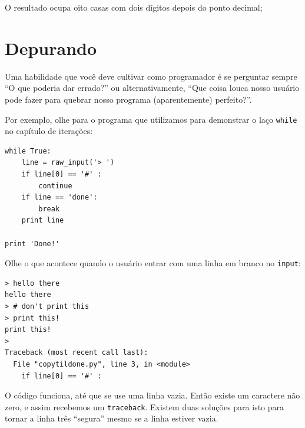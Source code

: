 {O resultado ocupa oito casas com dois dígitos
depois do ponto decimal;

\section{Depurando}


Uma habilidade que você deve cultivar como programador é se perguntar sempre
``O que poderia dar errado?'' ou alternativamente, ``Que coisa louca nosso
usuário pode fazer para quebrar nosso programa (aparentemente) perfeito?''.


Por exemplo, olhe para o programa que utilizamos para demonstrar o laço
{\tt while} no capítulo de iterações:

\beforeverb
\begin{verbatim}
while True:
    line = raw_input('> ')
    if line[0] == '#' :
        continue
    if line == 'done':
        break
    print line

print 'Done!'
\end{verbatim}
\afterverb
%
%
Olhe o que acontece quando o usuário entrar com uma linha em branco no
{\tt input}:

\beforeverb
\begin{verbatim}
> hello there
hello there
> # don't print this
> print this!
print this!
>
Traceback (most recent call last):
  File "copytildone.py", line 3, in <module>
    if line[0] == '#' :
\end{verbatim}
\afterverb
%
%

O código funciona, até que se use uma linha vazia. Então existe um caractere
não zero, e assim recebemos um {\tt traceback}. Existem duas soluções para isto
para tornar a linha três ``segura'' mesmo se a linha estiver vazia.

}

